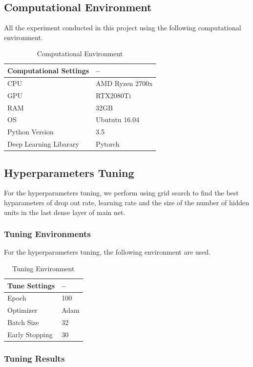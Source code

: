 \documentclass{article}
\begin{document}
\subsection{Computational Environment}

All the experiment conducted in this project using the following computational environment. 
\begin{table}[htb]
	\caption{Computational Environment}
	\label{sample-table}
	\centering
	\begin{tabular}{ll}
		\toprule
		\cmidrule{1-2}
		Computational Settings & -- \\
		\midrule
		CPU & AMD Ryzen 2700x \\
		GPU & RTX2080Ti \\
		RAM & 32GB \\
		OS & Ubututu 16.04 \\
		Python Version & 3.5 \\
		Deep Learning Libarary & Pytorch \\
		\midrule
	\end{tabular}
\end{table}
\subsection{Hyperparameters Tuning}
For the hyperparameters tuning, we perform using grid search to find the best hyparameters of drop out rate, learning rate and the size of the number of hidden units in the last dense layer of main net.

\subsubsection{Tuning Environments}
For the hyperparameters tuning, the following environment are used. 

\begin{table}[htb]
	\caption{Tuning Environment}
	\label{sample-table}
	\centering
	\begin{tabular}{ll}
		\toprule
		\cmidrule{1-2}
		Tune Settings & -- \\
		\midrule
		Epoch & 100 \\
		Optimizer & Adam \\
		Batch Size & 32 \\
		Early Stopping & 30 \\
		\midrule
	\end{tabular}
\end{table}


\subsubsection{Tuning Results}
\end{document}
